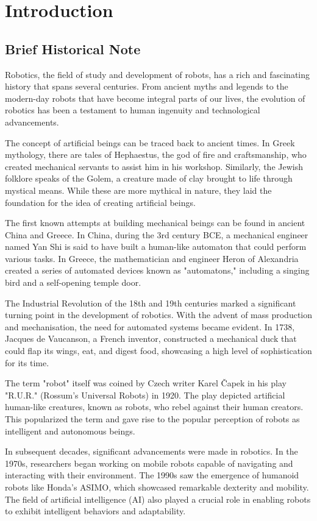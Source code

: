 \chapter{Introduction}
\section{Brief Historical Note}
Robotics, the field of study and development of robots, has a rich and fascinating history that spans several centuries. From ancient myths and legends to the modern-day robots that have become integral parts of our lives, the evolution of robotics has been a testament to human ingenuity and technological advancements.

The concept of artificial beings can be traced back to ancient times. In Greek mythology, there are tales of Hephaestus, the god of fire and craftsmanship, who created mechanical servants to assist him in his workshop. Similarly, the Jewish folklore speaks of the Golem, a creature made of clay brought to life through mystical means. While these are more mythical in nature, they laid the foundation for the idea of creating artificial beings.

The first known attempts at building mechanical beings can be found in ancient China and Greece. In China, during the 3rd century BCE, a mechanical engineer named Yan Shi is said to have built a human-like automaton that could perform various tasks. In Greece, the mathematician and engineer Heron of Alexandria created a series of automated devices known as "automatons," including a singing bird and a self-opening temple door.

The Industrial Revolution of the 18th and 19th centuries marked a significant turning point in the development of robotics. With the advent of mass production and mechanisation, the need for automated systems became evident. In 1738, Jacques de Vaucanson, a French inventor, constructed a mechanical duck that could flap its wings, eat, and digest food, showcasing a high level of sophistication for its time.

The term "robot" itself was coined by Czech writer Karel Čapek in his play "R.U.R." (Rossum's Universal Robots) in 1920. The play depicted artificial human-like creatures, known as robots, who rebel against their human creators. This popularized the term and gave rise to the popular perception of robots as intelligent and autonomous beings.

In subsequent decades, significant advancements were made in robotics. In the 1970s, researchers began working on mobile robots capable of navigating and interacting with their environment. The 1990s saw the emergence of humanoid robots like Honda's ASIMO, which showcased remarkable dexterity and mobility. The field of artificial intelligence (AI) also played a crucial role in enabling robots to exhibit intelligent behaviors and adaptability.

